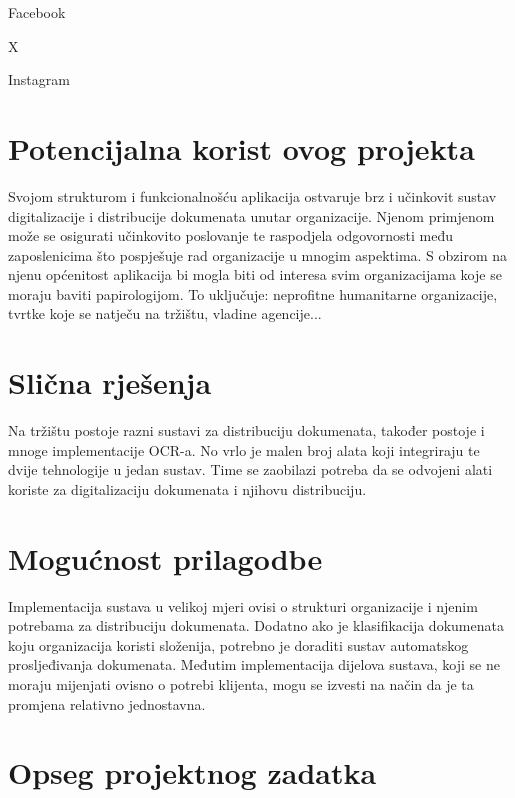 	\begin{packed_item}
		\item Facebook
		\item X
		\item Instagram
	\end{packed_item}
	
	\section{Potencijalna korist ovog projekta}
	
	Svojom strukturom i funkcionalnošću aplikacija ostvaruje brz i učinkovit sustav digitalizacije i distribucije dokumenata unutar organizacije. Njenom primjenom može se osigurati učinkovito poslovanje te raspodjela odgovornosti među zaposlenicima što pospješuje rad organizacije u mnogim aspektima. S obzirom na njenu općenitost aplikacija bi mogla biti  od interesa svim organizacijama koje se moraju baviti papirologijom. To uključuje: neprofitne humanitarne organizacije, tvrtke koje se natječu na tržištu, vladine agencije...\\
	
	\section{Slična rješenja}
	
	Na tržištu postoje razni sustavi za distribuciju dokumenata, također postoje i mnoge implementacije OCR-a. No vrlo je malen broj alata koji integriraju te dvije tehnologije u jedan sustav. Time se zaobilazi potreba da se odvojeni alati koriste za digitalizaciju dokumenata i njihovu distribuciju. \\
	
	\section{Mogućnost prilagodbe}
	
	Implementacija sustava u velikoj mjeri ovisi o strukturi organizacije i njenim potrebama za distribuciju dokumenata. Dodatno ako je klasifikacija dokumenata koju organizacija koristi složenija, potrebno je doraditi sustav automatskog prosljeđivanja dokumenata. Međutim implementacija dijelova sustava, koji se ne moraju mijenjati ovisno o potrebi klijenta, mogu se izvesti na način da je ta promjena relativno jednostavna.
	
	\section{Opseg projektnog zadatka}
	
